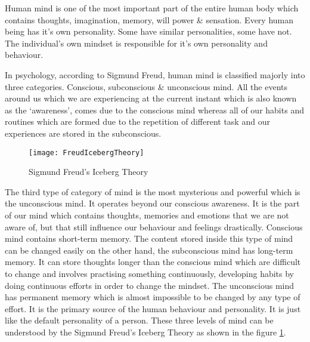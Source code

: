 Human mind is one of the most important part of the entire human body which contains thoughts, imagination, memory, will power \& sensation. Every human being has it's own personality. Some have similar personalities, some have not. The individual's own mindset is responsible for it's own personality and behaviour.

In psychology, according to Sigmund Freud, human mind is classified majorly into three categories. Conscious, subconscious \& unconscious mind. All the events around us which we are experiencing at the current instant which is also known as the `awareness', comes due to the conscious mind whereas all of our habits and routines which are formed due to the repetition of different task and our experiences are stored in the subconscious.
 
\begin{figure}[H]
	\texttt{[image: FreudIcebergTheory]}
	\caption{Sigmund Freud's Iceberg Theory}
	\label{Fig:fig1}
\end{figure}

The third type of category of mind is the most mysterious and powerful which is the unconscious mind. It operates beyond our conscious awareness. It is the part of our mind which contains thoughts, memories and emotions that we are not aware of, but that still influence our behaviour and feelings drastically. Conscious mind contains short-term memory. The content stored inside this type of mind can be changed easily on the other hand, the subconscious mind has long-term memory. It can store thoughts longer than the conscious mind which are difficult to change and involves practising something continuously, developing habits by doing continuous efforts in order to change the mindset. The unconscious mind has permanent memory which is almost impossible to be changed by any type of effort. It is the primary source of the human behaviour and personality. It is just like the default personality of a person. These three levels of mind can be understood by the Sigmund Freud's Iceberg Theory as shown in the figure \ref{Fig:fig1}.